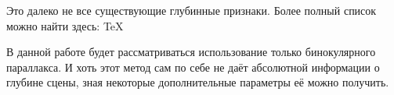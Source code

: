 	Это далеко не все существующие глубинные признаки. Более полный список можно найти здесь: \TeX \cite{Wikipedia:Depth_perception}
	
	В данной работе будет рассматриваться использование только бинокулярного параллакса. И хоть этот метод сам по себе не даёт абсолютной информации о глубине сцены, зная некоторые дополнительные параметры её можно получить.
	
	
	
	

	
